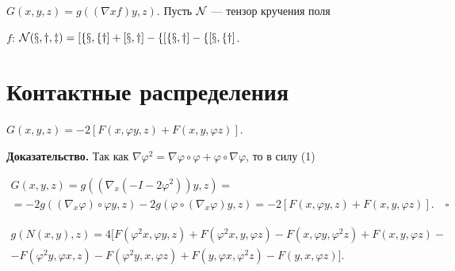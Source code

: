 $G(x,y,z)=g((\nabla x f)y,z)$. Пусть $\cal N$ --- тензор кручения поля 


$f$: $\cal N(x,y,z)=[f x,f y]+[x,y]-f[f x,y]-f[x,f y]$. 


 


\section{Контактные распределения} 


 


\begin{lem} 


$G(x,y,z)=-2[F(x,\varphi y,z)+F(x,y,\varphi z)]$. 


\end{lem} 


 


{\bf Доказательство.} Так как $\nabla\varphi^2=\nabla\varphi\circ 


\varphi+\varphi\circ \nabla\varphi$, то в силу (1) 


\begin{multline*} 


G(x,y,z)=g((\nabla_x(-I-2\varphi^2))y,z)= \\ 


=-2g((\nabla_x\varphi)\circ\varphi y,z)- 


2g(\varphi\circ(\nabla_x\varphi)y,z)= 


-2[F(x,\varphi y,z)+F(x,y,\varphi z)].\quad\square 


\end{multline*} 


 


\begin{lem} 


\begin{multline*} 


g(N(x,y),z)=4[F(\varphi^2x,\varphi y,z)+F(\varphi^2x,y,\varphi z)- 


F(x,\varphi y,\varphi^2z)+F(x,y,\varphi z)- \\ 


-F(\varphi^2y,\varphi x,z)-F(\varphi^2y,x,\varphi z)+ 


F(y,\varphi x,\varphi^2z)-F(y,x,\varphi z)]. 


\end{multline*} 


\end{lem} 


